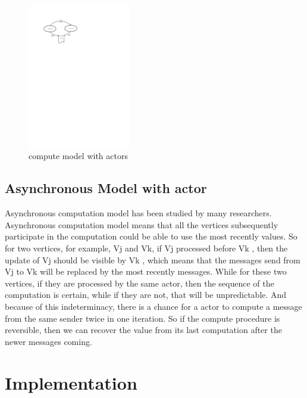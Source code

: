 \documentclass[twocolumn,a4paper,10pt]{article}
\begin{document}
\begin{figure}[htbp]
\centering
 \begin{minipage}[]{1.4\textwidth}
     \includegraphics[width=0.4\textwidth,angle=0]{figure/computemodel.pdf}
\end{minipage}
    \caption{compute model with actors}
\end{figure}

\subsection{Asynchronous Model with actor}
Asynchronous computation model has been studied by many researchers. Asynchronous computation model means that all the vertices subsequently participate in the computation could be able to use the most recently values. So for two vertices, for example, Vj and Vk, if Vj processed before Vk , then the update of Vj should be visible by Vk , which means that the messages send from Vj to Vk will be replaced by the most recently messages. While for these two vertices, if they are processed by the same actor, then the sequence of the computation is certain, while if they are not, that will be unpredictable. And because of this indeterminacy, there is a chance for a actor to compute a message from the same sender twice in one iteration. So if the compute procedure is reversible, then we can recover the value from its last computation after the newer messages coming.

\section{Implementation}
\end{document}

